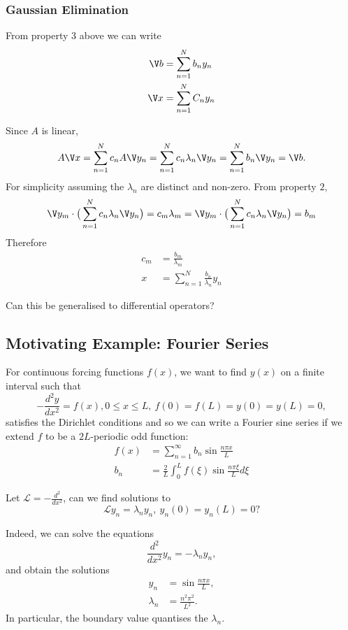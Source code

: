 \documentclass[a4paper]{article}
\renewcommand*\L{\mathcal{L}}
\begin{document}
\subsubsection{Gaussian Elimination}

From property \(3\) above we can write
\begin{align*}
  \V b &= \sum_{n=1}^{N}b_n y_n \\
  \V x &=\sum_{n=1}^{N}C_n y_n
\end{align*}

Since \(A\) is linear,
\[
  A \V x = \sum_{n=1}^{N}c_n A \V y_n = \sum_{n=1}^{N}c_n \lambda_n \V y_n = \sum_{n=1}^{N}b_n \V y_n = \V b.
\]
For simplicity assuming the \(\lambda_n\) are distinct and non-zero. From property \(2\),
\[
\V y_m \cdot \big( \sum_{n=1}^{N}c_n \lambda_n \V y_n \big) = c_m \lambda_m = \V y_m \cdot \big( \sum_{n=1}^{N}c_n \lambda_n \V y_n \big) = b_m
\]
Therefore
\begin{align*}
  c_m &= \frac{b_m}{\lambda_m} \\
  x &= \sum_{n=1}^{N}\frac{b_n}{\lambda_n}y_n
\end{align*}

\begin{question}
  Can this be generalised to differential operators?
\end{question}

\subsection{Motivating Example: Fourier Series}
\label{subsec:motivating}

For continuous forcing functions \(f(x)\), we want to find \(y(x)\) on a finite interval such that
\[
  -\frac{d^2y}{dx^2} = f(x), 0 \leq x \leq L, \: f(0) = f(L) = y(0) = y(L) = 0,
\]
satisfies the Dirichlet conditions and so we can write a Fourier sine series if we extend \(f\) to be a \(2L\)-periodic odd function:
\begin{align*}
  f(x) &= \sum_{n=1}^{\infty}b_n \sin \frac{n\pi x}{L} \\
  b_n &= \frac{2}{L} \int_{0}^{L} f(\xi) \sin \frac{n\pi \xi}{L} d\xi
\end{align*}

Let \(\L = - \frac{d^2}{dx^2}\), can we find solutions to
\[
\L y_n = \lambda_n y_n,\: y_n(0) = y_n(L) = 0?
\]

Indeed, we can solve the equations
\[
  \frac{d^2}{dx^2} y_n = - \lambda_n y_n,
\]
and obtain the solutions
\begin{align*}
  y_n &= \sin \frac{n\pi x}{L}, \\
  \lambda_n &= \frac{n^2\pi^2}{L^2}.
\end{align*}
In particular, the boundary value quantises the \(\lambda_n\).
\end{document}
